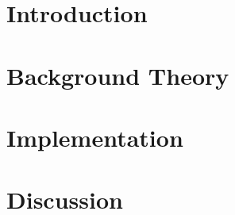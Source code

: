 \documentclass[11pt,a4paper,bibtotoc,idxtotoc,headsepline,footsepline,footexclude,DIV13,oneside]{scrbook}
\begin{document}
	\frontmatter
	
	
%	
%	
	
	
%	
	
	
	
	
	
	
	
	

	\tableofcontents
   	

	\mainmatter
	
	
		\chapter{Introduction}
		\label{chapter:Introduction}
		
		
		
		\chapter{Background Theory}
		\label{chapter:Background}
		
		
		
		\chapter{Implementation}
		\label{chapter:Implementation}		
		
		
		\chapter{Discussion}
		\label{chapter:Discussion}		
		
		
\end{document}
